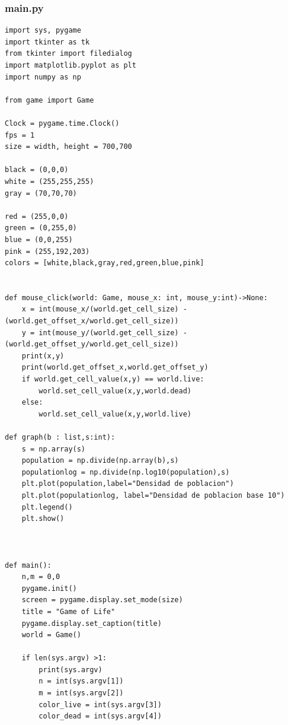 \documentclass[10pt]{article}
\begin{document}
            \subsubsection{main.py}
            \lstset{language=Python}
                \begin{lstlisting}
import sys, pygame
import tkinter as tk
from tkinter import filedialog
import matplotlib.pyplot as plt
import numpy as np

from game import Game

Clock = pygame.time.Clock()
fps = 1
size = width, height = 700,700

black = (0,0,0)
white = (255,255,255)
gray = (70,70,70)

red = (255,0,0)
green = (0,255,0)
blue = (0,0,255)
pink = (255,192,203)
colors = [white,black,gray,red,green,blue,pink]


def mouse_click(world: Game, mouse_x: int, mouse_y:int)->None:
    x = int(mouse_x/(world.get_cell_size) - (world.get_offset_x/world.get_cell_size))
    y = int(mouse_y/(world.get_cell_size) - (world.get_offset_y/world.get_cell_size))
    print(x,y)
    print(world.get_offset_x,world.get_offset_y)
    if world.get_cell_value(x,y) == world.live:
        world.set_cell_value(x,y,world.dead)
    else:
        world.set_cell_value(x,y,world.live)

def graph(b : list,s:int):
    s = np.array(s)
    population = np.divide(np.array(b),s)
    populationlog = np.divide(np.log10(population),s)
    plt.plot(population,label="Densidad de poblacion")
    plt.plot(populationlog, label="Densidad de poblacion base 10")
    plt.legend()
    plt.show()
    


def main():
    n,m = 0,0
    pygame.init()
    screen = pygame.display.set_mode(size)
    title = "Game of Life"
    pygame.display.set_caption(title)
    world = Game()
    
    if len(sys.argv) >1:
        print(sys.argv)
        n = int(sys.argv[1])
        m = int(sys.argv[2])
        color_live = int(sys.argv[3])
        color_dead = int(sys.argv[4])
        

\end{lstlisting}
\end{document}
